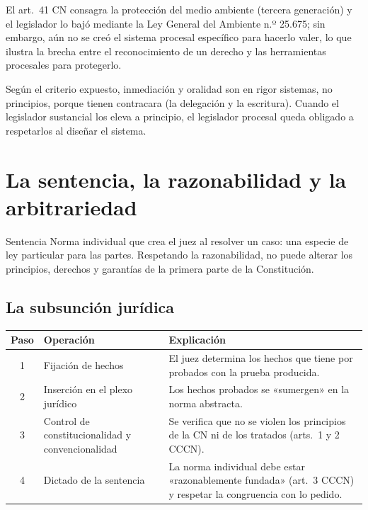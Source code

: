 \documentclass[12pt,oneside]{book}
\renewcommand{\arraystretch}{1.15}
\begin{document}
El art.~41 CN consagra la protección del medio ambiente (tercera generación) y el legislador lo bajó mediante la Ley General del Ambiente n.º 25.675; sin embargo, aún no se creó el sistema procesal específico para hacerlo valer, lo que ilustra la brecha entre el reconocimiento de un derecho y las herramientas procesales para protegerlo.

\begin{note}
Según el criterio expuesto, inmediación y oralidad son en rigor sistemas, no principios, porque tienen contracara (la delegación y la escritura). Cuando el legislador sustancial los eleva a principio, el legislador procesal queda obligado a respetarlos al diseñar el sistema.
\end{note}

\section{La sentencia, la razonabilidad y la arbitrariedad}

\begin{definition}{Sentencia}
Norma individual que crea el juez al resolver un caso: una especie de ley particular para las partes. Respetando la razonabilidad, no puede alterar los principios, derechos y garantías de la primera parte de la Constitución.
\end{definition}

\subsection{La subsunción jurídica}

\begin{table}[H]
\centering
\renewcommand{\arraystretch}{1.2}
\begin{tabularx}{\textwidth}{c>{\RaggedRight\arraybackslash}p{4cm}>{\RaggedRight\arraybackslash}X}
\toprule
\textbf{Paso} & \textbf{Operación} & \textbf{Explicación} \\
\midrule
1 & Fijación de hechos & El juez determina los hechos que tiene por probados con la prueba producida. \\
2 & Inserción en el plexo jurídico & Los hechos probados se «sumergen» en la norma abstracta. \\
3 & Control de constitucionalidad y convencionalidad & Se verifica que no se violen los principios de la CN ni de los tratados (arts.~1 y 2 CCCN). \\
4 & Dictado de la sentencia & La norma individual debe estar «razonablemente fundada» (art.~3 CCCN) y respetar la congruencia con lo pedido. \\
\bottomrule
\end{tabularx}
\end{table}
\end{document}
